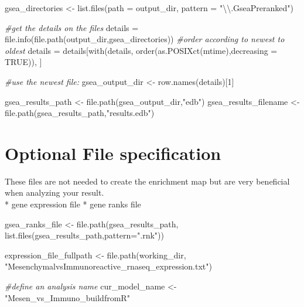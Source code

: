 \documentclass[
]{book}
\newenvironment{Shaded}{\begin{snugshade}}{\end{snugshade}}
\newcommand{\AttributeTok}[1]{\textcolor[rgb]{0.77,0.63,0.00}{#1}}
\newcommand{\CommentTok}[1]{\textcolor[rgb]{0.56,0.35,0.01}{\textit{#1}}}
\newcommand{\ConstantTok}[1]{\textcolor[rgb]{0.00,0.00,0.00}{#1}}
\newcommand{\DecValTok}[1]{\textcolor[rgb]{0.00,0.00,0.81}{#1}}
\newcommand{\FunctionTok}[1]{\textcolor[rgb]{0.00,0.00,0.00}{#1}}
\newcommand{\NormalTok}[1]{#1}
\newcommand{\OtherTok}[1]{\textcolor[rgb]{0.56,0.35,0.01}{#1}}
\newcommand{\SpecialCharTok}[1]{\textcolor[rgb]{0.00,0.00,0.00}{#1}}
\newcommand{\StringTok}[1]{\textcolor[rgb]{0.31,0.60,0.02}{#1}}
\begin{document}
\begin{Shaded}
\begin{Highlighting}[]
\NormalTok{gsea\_directories }\OtherTok{\textless{}{-}} \FunctionTok{list.files}\NormalTok{(}\AttributeTok{path =}\NormalTok{ output\_dir, }\AttributeTok{pattern =} \StringTok{"}\SpecialCharTok{\textbackslash{}\textbackslash{}}\StringTok{.GseaPreranked"}\NormalTok{)}

\CommentTok{\#get the details on the files}
\NormalTok{details }\OtherTok{=} \FunctionTok{file.info}\NormalTok{(}\FunctionTok{file.path}\NormalTok{(output\_dir,gsea\_directories))}
\CommentTok{\#order according to newest to oldest}
\NormalTok{details }\OtherTok{=}\NormalTok{ details[}\FunctionTok{with}\NormalTok{(details, }\FunctionTok{order}\NormalTok{(}\FunctionTok{as.POSIXct}\NormalTok{(mtime),}\AttributeTok{decreasing =} \ConstantTok{TRUE}\NormalTok{)), ]}

\CommentTok{\#use the newest file:}
\NormalTok{gsea\_output\_dir }\OtherTok{\textless{}{-}} \FunctionTok{row.names}\NormalTok{(details)[}\DecValTok{1}\NormalTok{]}

\NormalTok{gsea\_results\_path }\OtherTok{\textless{}{-}} \FunctionTok{file.path}\NormalTok{(gsea\_output\_dir,}\StringTok{"edb"}\NormalTok{)}
\NormalTok{gsea\_results\_filename }\OtherTok{\textless{}{-}} \FunctionTok{file.path}\NormalTok{(gsea\_results\_path,}\StringTok{"results.edb"}\NormalTok{)}
\end{Highlighting}
\end{Shaded}

\hypertarget{optional-file-specification}{%
\section{Optional File specification}\label{optional-file-specification}}

These files are not needed to create the enrichment map but are very beneficial when analyzing your result.\\
* gene expression file
* gene ranks file

\begin{Shaded}
\begin{Highlighting}[]
\NormalTok{gsea\_ranks\_file }\OtherTok{\textless{}{-}} \FunctionTok{file.path}\NormalTok{(gsea\_results\_path,}
                             \FunctionTok{list.files}\NormalTok{(gsea\_results\_path,}\AttributeTok{pattern=}\StringTok{".rnk"}\NormalTok{))}

\NormalTok{expression\_file\_fullpath }\OtherTok{\textless{}{-}} \FunctionTok{file.path}\NormalTok{(working\_dir,}
                          \StringTok{"MesenchymalvsImmunoreactive\_rnaseq\_expression.txt"}\NormalTok{)}

\CommentTok{\#define an analysis name}
\NormalTok{cur\_model\_name }\OtherTok{\textless{}{-}} \StringTok{"Mesen\_vs\_Immuno\_buildfromR"}
\end{Highlighting}
\end{Shaded}
\end{document}
